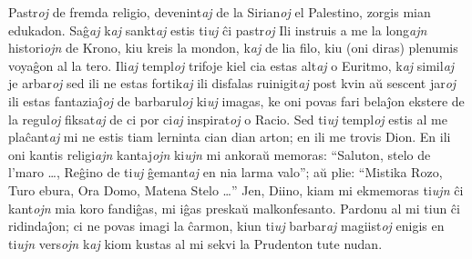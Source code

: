 \begin{parcolumns}[nofirstindent=true]{2}
{\begin{otherlanguage}{esperanto}
        Pastr\emph{oj} de fremda religio, devenint\emph{aj} de la Sirian\emph{oj} el Palestino, zorgis mian edukadon. Saĝ\emph{aj} k\emph{aj} sankt\emph{aj} estis ti\emph{uj} ĉi pastr\emph{oj}  Ili instruis a me la long\emph{ajn} histori\emph{ojn} de Krono, kiu kreis la mondon, k\emph{aj} de lia filo, kiu (oni diras) plenumis voyaĝon al la tero. Ili\emph{aj} templ\emph{oj} trifoje kiel cia estas alt\emph{aj}  o Euritmo, k\emph{aj} simil\emph{aj} je arbar\emph{oj}  sed ili ne estas fortik\emph{aj}  ili disfalas ruinigit\emph{aj} post kvin aŭ sescent jar\emph{oj}  ili estas fantaziaĵ\emph{oj} de barbarul\emph{oj}  ki\emph{uj} imagas, ke oni povas fari belaĵon ekstere de la regul\emph{oj} fiksat\emph{aj} de ci por ci\emph{aj} inspirat\emph{oj}  o Racio. Sed ti\emph{uj} templ\emph{oj} estis al me plaĉant\emph{aj}  mi ne estis tiam lerninta cian dian arton; en ili me trovis Dion. En ili oni kantis religi\emph{ajn} kantaj\emph{ojn}  ki\emph{ujn} mi ankoraŭ memoras: ``Saluton, stelo de l'maro \ldots, Reĝino de ti\emph{uj} ĝemant\emph{aj} en nia larma valo”; aŭ plie: ``Mistika Rozo, Turo ebura, Ora Domo, Matena Stelo \ldots'' Jen, Diino, kiam mi ekmemoras ti\emph{ujn} ĉi kant\emph{ojn}  mia koro fandiĝas, mi iĝas preskaŭ malkonfesanto. Pardonu al mi tiun ĉi ridindaĵon; ci ne povas imagi la ĉarmon, kiun ti\emph{uj} barbar\emph{aj} magiist\emph{oj} enigis en ti\emph{ujn} vers\emph{ojn}  k\emph{aj} kiom kustas al mi sekvi la Prudenton tute nudan. 
        \end{otherlanguage}
    }
\end{parcolumns}
